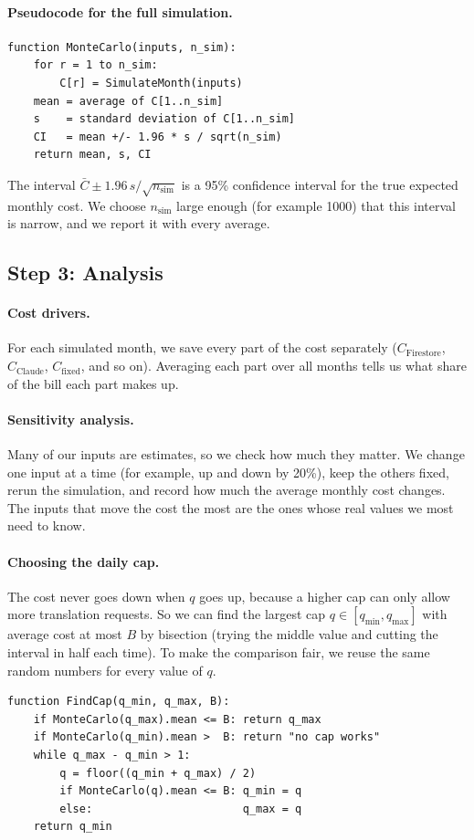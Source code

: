 \documentclass{article}
\begin{document}
\paragraph{Pseudocode for the full simulation.}
\begin{verbatim}
function MonteCarlo(inputs, n_sim):
    for r = 1 to n_sim:
        C[r] = SimulateMonth(inputs)
    mean = average of C[1..n_sim]
    s    = standard deviation of C[1..n_sim]
    CI   = mean +/- 1.96 * s / sqrt(n_sim)
    return mean, s, CI
\end{verbatim}
The interval $\bar{C} \pm 1.96\, s/\sqrt{n_{\text{sim}}}$ is a 95\% confidence interval for the true expected monthly cost. We choose $n_{\text{sim}}$ large enough (for example 1000) that this interval is narrow, and we report it with every average.

\subsection{Step 3: Analysis}

\paragraph{Cost drivers.}
For each simulated month, we save every part of the cost separately ($C_{\text{Firestore}}$, $C_{\text{Claude}}$, $C_{\text{fixed}}$, and so on). Averaging each part over all months tells us what share of the bill each part makes up.

\paragraph{Sensitivity analysis.}
Many of our inputs are estimates, so we check how much they matter. We change one input at a time (for example, up and down by 20\%), keep the others fixed, rerun the simulation, and record how much the average monthly cost changes. The inputs that move the cost the most are the ones whose real values we most need to know.

\paragraph{Choosing the daily cap.}
The cost never goes down when $q$ goes up, because a higher cap can only allow more translation requests. So we can find the largest cap $q \in [q_{\min}, q_{\max}]$ with average cost at most $B$ by bisection (trying the middle value and cutting the interval in half each time). To make the comparison fair, we reuse the same random numbers for every value of $q$.
\begin{verbatim}
function FindCap(q_min, q_max, B):
    if MonteCarlo(q_max).mean <= B: return q_max
    if MonteCarlo(q_min).mean >  B: return "no cap works"
    while q_max - q_min > 1:
        q = floor((q_min + q_max) / 2)
        if MonteCarlo(q).mean <= B: q_min = q
        else:                       q_max = q
    return q_min
\end{verbatim}
\end{document}
